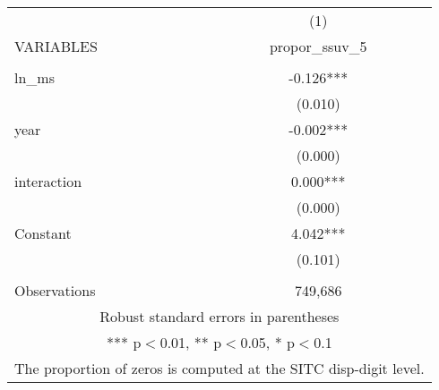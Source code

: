 \begin{tabular}{lc} \hline
 & (1) \\
VARIABLES & propor\_ssuv\_5 \\ \hline
 &  \\
ln\_ms & -0.126*** \\
 & (0.010) \\
year & -0.002*** \\
 & (0.000) \\
interaction & 0.000*** \\
 & (0.000) \\
Constant & 4.042*** \\
 & (0.101) \\
 &  \\
 Observations & 749,686 \\ \hline
\multicolumn{2}{c}{ Robust standard errors in parentheses} \\
\multicolumn{2}{c}{ *** p$<$0.01, ** p$<$0.05, * p$<$0.1} \\
\multicolumn{2}{c}{ The proportion of zeros is computed at the SITC disp-digit level.} \\
\end{tabular}
